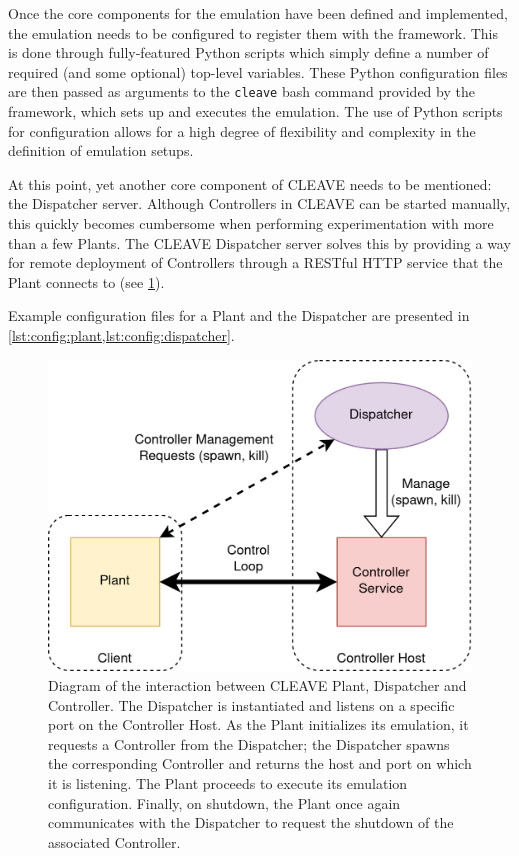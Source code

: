 Once the core components for the emulation have been defined and implemented, the emulation needs to be configured to register them with the framework.
This is done through fully-featured Python scripts which simply define a number of required (and some optional) top-level variables.
These Python configuration files are then passed as arguments to the \texttt{cleave} bash command provided by the framework, which sets up and executes the emulation.
The use of Python scripts for configuration allows for a high degree of flexibility and complexity in the definition of emulation setups.

At this point, yet another core component of CLEAVE needs to be mentioned: the Dispatcher server.
Although Controllers in CLEAVE can be started manually, this quickly becomes cumbersome when performing experimentation with more than a few Plants.
The CLEAVE Dispatcher server solves this by providing a way for remote deployment of Controllers through a RESTful HTTP service that the Plant connects to (see \cref{fig:cleave:dispatch}).

Example configuration files for a Plant and the Dispatcher are presented in \cref{lst:config:plant,lst:config:dispatcher}.

\begin{figure}
    \centering
    \includegraphics[width=.85\columnwidth]{images/CLEAVE_dispatcher.png}
    \caption{
        Diagram of the interaction between CLEAVE Plant, Dispatcher and Controller.
        The Dispatcher is instantiated and listens on a specific port on the Controller Host. 
        As the Plant initializes its emulation, it requests a Controller from the Dispatcher; the Dispatcher spawns the corresponding Controller and returns the host and port on which it is listening.
        The Plant proceeds to execute its emulation configuration.
        Finally, on shutdown, the Plant once again communicates with the Dispatcher to request the shutdown of the associated Controller.
    }\label{fig:cleave:dispatch}
\end{figure}

